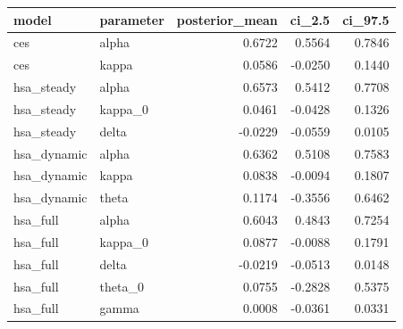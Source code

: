 \begin{tabular}{llrrr}
\toprule
model & parameter & posterior\_mean & ci\_2.5 & ci\_97.5 \\
\midrule
ces & alpha & 0.6722 & 0.5564 & 0.7846 \\
ces & kappa & 0.0586 & -0.0250 & 0.1440 \\
hsa\_steady & alpha & 0.6573 & 0.5412 & 0.7708 \\
hsa\_steady & kappa\_0 & 0.0461 & -0.0428 & 0.1326 \\
hsa\_steady & delta & -0.0229 & -0.0559 & 0.0105 \\
hsa\_dynamic & alpha & 0.6362 & 0.5108 & 0.7583 \\
hsa\_dynamic & kappa & 0.0838 & -0.0094 & 0.1807 \\
hsa\_dynamic & theta & 0.1174 & -0.3556 & 0.6462 \\
hsa\_full & alpha & 0.6043 & 0.4843 & 0.7254 \\
hsa\_full & kappa\_0 & 0.0877 & -0.0088 & 0.1791 \\
hsa\_full & delta & -0.0219 & -0.0513 & 0.0148 \\
hsa\_full & theta\_0 & 0.0755 & -0.2828 & 0.5375 \\
hsa\_full & gamma & 0.0008 & -0.0361 & 0.0331 \\
\bottomrule
\end{tabular}

